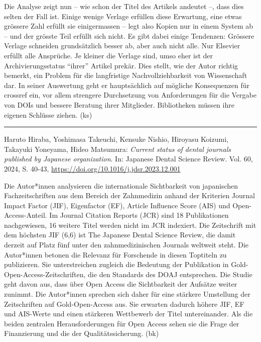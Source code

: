 \documentclass[a4paper,
fontsize=11pt,
oneside,
numbers=noperiodatend,
parskip=half-,
bibliography=totoc,
final
]{scrartcl}
\begin{document}
Die Analyse zeigt nun -- wie schon der Titel des Artikels andeutet --,
dass dies selten der Fall ist. Einige wenige Verlage erfüllen diese
Erwartung, eine etwas grössere Zahl erfüllt sie einigermassen -- legt
also Kopien nur in einem System ab -- und der grösste Teil erfüllt sich
nicht. Es gibt dabei einige Tendenzen: Grössere Verlage schneiden
grundsätzlich besser ab, aber auch nicht alle. Nur Elsevier erfüllt alle
Ansprüche. Je kleiner die Verlage sind, umso eher ist der
Archivierungsstatus \enquote{ihrer} Artikel prekär. Dies stellt, wie der
Autor richtig bemerkt, ein Problem für die langfristige
Nachvollziehbarkeit von Wissenschaft dar. In seiner Auswertung geht er
hauptsächlich auf mögliche Konsequenzen für crossref ein, vor allem
strengere Durchsetzung von Anforderungen für die Vergabe von DOIs und
bessere Beratung ihrer Mitglieder. Bibliotheken müssen ihre eigenen
Schlüsse ziehen. (ks)

\begin{center}\rule{0.5\linewidth}{0.5pt}\end{center}

Haruto Hiraba, Yoshimasa Takeuchi, Kensuke Nishio, Hiroyasu Koizumi,
Takayuki Yoneyama, Hideo Matsumura: \emph{Current status of dental
journals published by Japanese organization}. In: Japanese Dental
Science Review. Vol. 60, 2024, S. 40-43,
\url{https://doi.org/10.1016/j.jdsr.2023.12.001}

Die Autor*innen analysieren die internationale Sichtbarkeit von
japanischen Fachzeitschriften aus dem Bereich der Zahnmedizin anhand der
Kriterien Journal Impact Factor (JIF), Eigenfactor (EF), Article
Influence Score (AIS) und Open-Access-Anteil. Im Journal Citation
Reports (JCR) sind 18 Publikationen nachgewiesen, 16 weitere Titel
werden nicht im JCR indexiert. Die Zeitschrift mit dem höchsten JIF
(6,6) ist The Japanese Dental Science Review, die damit derzeit auf
Platz fünf unter den zahnmedizinischen Journals weltweit steht. Die
Autor*innen betonen die Relevanz für Forschende in diesen Toptiteln zu
publizieren. Sie unterstreichen zugleich die Bedeutung der Publikation
in Gold-Open-Access-Zeitschriften, die den Standards des DOAJ
entsprechen. Die Studie geht davon aus, dass über Open Access die
Sichtbarkeit der Aufsätze weiter zunimmt. Die Autor*innen sprechen sich
daher für eine stärkere Umstellung der Zeitschriften auf
Gold-Open-Access aus. Sie erwarten dadurch höhere JIF, EF und AIS-Werte
und einen stärkeren Wettbewerb der Titel untereinander. Als die beiden
zentralen Herausforderungen für Open Access sehen sie die Frage der
Finanzierung und die der Qualitätssicherung. (bk)
\end{document}
